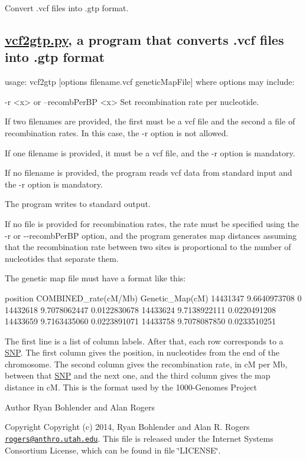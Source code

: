 Convert .vcf files into .gtp format.

\subsection*{\hyperlink{vcf2gtp_8py}{vcf2gtp.\+py}, a program that converts .vcf files into .gtp format }

\begin{DoxyVerb}usage: vcf2gtp [options filename.vcf geneticMapFile]
where options may include:

  -r <x> or --recombPerBP <x>     Set recombination rate per nucleotide.

If two filenames are provided, the first must be a vcf file and the
second a file of recombination rates. In this case, the -r option is
not allowed.

If one filename is provided, it must be a vcf file, and the -r option
is mandatory.

If no filename is provided, the program reads vcf data from standard
input and the -r option is mandatory.

The program writes to standard output.
\end{DoxyVerb}


If no file is provided for recombination rates, the rate must be specified using the {\ttfamily -\/r} or {\ttfamily -\/-\/recomb\+Per\+B\+P} option, and the program generates map distances assuming that the recombination rate between two sites is proportional to the number of nucleotides that separate them.

The genetic map file must have a format like this\+: \begin{DoxyVerb}position COMBINED_rate(cM/Mb) Genetic_Map(cM)
14431347 9.6640973708 0
14432618 9.7078062447 0.0122830678
14433624 9.7138922111 0.0220491208
14433659 9.7163435060 0.0223891071
14433758 9.7078087850 0.0233510251
\end{DoxyVerb}


The first line is a list of column labels. After that, each row corresponds to a \hyperlink{struct_s_n_p}{S\+N\+P}. The first column gives the position, in nucleotides from the end of the chromosome. The second column gives the recombination rate, in c\+M per Mb, between that \hyperlink{struct_s_n_p}{S\+N\+P} and the next one, and the third column gives the map distance in c\+M. This is the format used by the 1000-\/\+Genomes Project

\begin{DoxyAuthor}{Author}
Ryan Bohlender and Alan Rogers 
\end{DoxyAuthor}
\begin{DoxyCopyright}{Copyright}
Copyright (c) 2014, Ryan Bohlender and Alan R. Rogers \href{mailto:rogers@anthro.utah.edu}{\tt rogers@anthro.\+utah.\+edu}. This file is released under the Internet Systems Consortium License, which can be found in file \char`\"{}\+L\+I\+C\+E\+N\+S\+E\char`\"{}. 
\end{DoxyCopyright}
